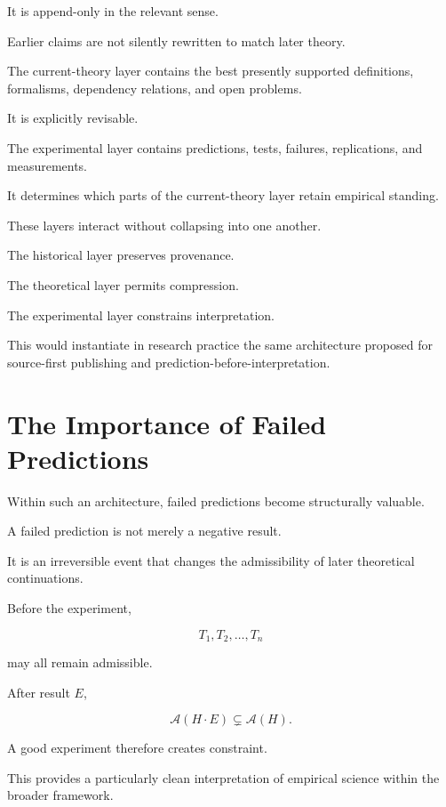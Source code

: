 \documentclass[11pt]{article}
\theoremstyle{remark}
\newcommand{\Adm}{\mathcal{A}}
\begin{document}
It is append-only in the relevant sense.

Earlier claims are not silently rewritten to match later theory.

The current-theory layer contains the best presently supported definitions, formalisms, dependency relations, and open problems.

It is explicitly revisable.

The experimental layer contains predictions, tests, failures, replications, and measurements.

It determines which parts of the current-theory layer retain empirical standing.

These layers interact without collapsing into one another.

The historical layer preserves provenance.

The theoretical layer permits compression.

The experimental layer constrains interpretation.

This would instantiate in research practice the same architecture proposed for source-first publishing and prediction-before-interpretation.

\section{The Importance of Failed Predictions}

Within such an architecture, failed predictions become structurally valuable.

A failed prediction is not merely a negative result.

It is an irreversible event that changes the admissibility of later theoretical continuations.

Before the experiment,

\begin{equation}
T_1,T_2,\ldots,T_n
\end{equation}

may all remain admissible.

After result $E$,

\begin{equation}
\Adm(H\cdot E)
\subsetneq
\Adm(H).
\end{equation}

A good experiment therefore creates constraint.

This provides a particularly clean interpretation of empirical science within the broader framework.
\end{document}
